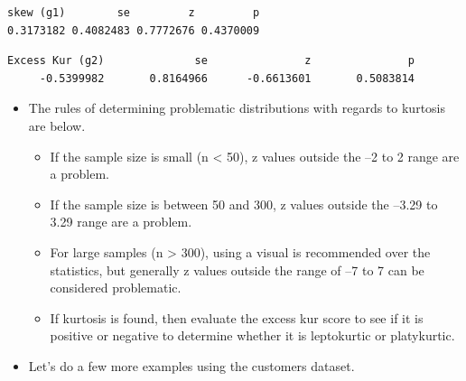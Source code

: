 \documentclass[
  letterpaper,
  DIV=11,
  numbers=noendperiod]{scrreprt}
\newenvironment{Shaded}{\begin{snugshade}}{\end{snugshade}}
\newcommand{\CommentTok}[1]{\textcolor[rgb]{0.37,0.37,0.37}{#1}}
\newcommand{\FunctionTok}[1]{\textcolor[rgb]{0.28,0.35,0.67}{#1}}
\newcommand{\NormalTok}[1]{\textcolor[rgb]{0.00,0.23,0.31}{#1}}
\newcommand{\SpecialCharTok}[1]{\textcolor[rgb]{0.37,0.37,0.37}{#1}}
\providecommand{\tightlist}{%
  \setlength{\itemsep}{0pt}\setlength{\parskip}{0pt}}\usepackage{longtable,booktabs,array}
\begin{document}
\begin{verbatim}
skew (g1)        se         z         p 
0.3173182 0.4082483 0.7772676 0.4370009 
\end{verbatim}

\begin{Shaded}
\end{Shaded}

\begin{verbatim}
Excess Kur (g2)              se               z               p 
     -0.5399982       0.8164966      -0.6613601       0.5083814 
\end{verbatim}

\begin{itemize}
\tightlist
\item
  The rules of determining problematic distributions with regards to
  kurtosis are below.

  \begin{itemize}
  \tightlist
  \item
    If the sample size is small (n \textless{} 50), z values outside the
    --2 to 2 range are a problem.
  \item
    If the sample size is between 50 and 300, z values outside the
    --3.29 to 3.29 range are a problem.
  \item
    For large samples (n \textgreater{} 300), using a visual is
    recommended over the statistics, but generally z values outside the
    range of --7 to 7 can be considered problematic.
  \item
    If kurtosis is found, then evaluate the excess kur score to see if
    it is positive or negative to determine whether it is leptokurtic or
    platykurtic.
  \end{itemize}
\item
  Let's do a few more examples using the customers dataset.
\end{itemize}

\begin{Shaded}
\end{Shaded}
\end{document}
